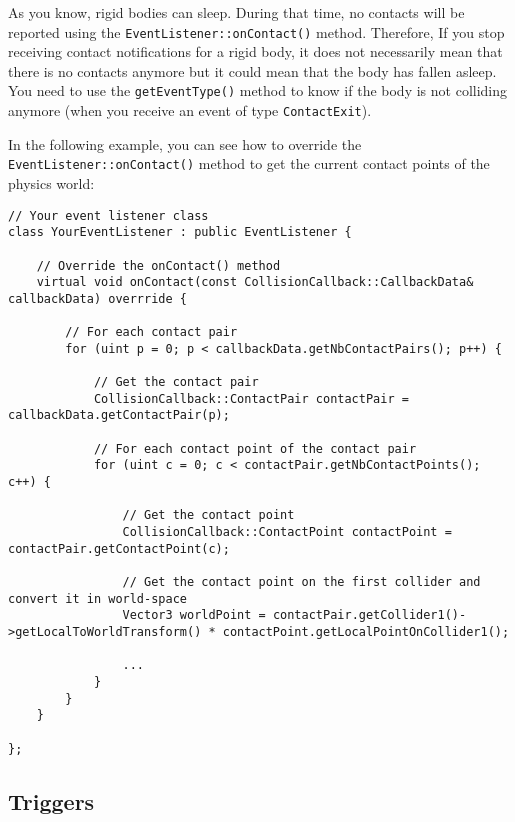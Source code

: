 \documentclass[a4paper,12pt]{article}
\begin{document}
    \begin{sloppypar}
    As you know, rigid bodies can sleep. During that time, no contacts will be reported using the \texttt{EventListener::onContact()} method. Therefore,
    If you stop receiving contact notifications for a rigid body, it does not necessarily mean that there is no contacts anymore but it could mean that the
    body has fallen asleep. You need to use the \texttt{getEventType()} method to know if the body is not colliding anymore (when you receive an event of type
    \texttt{ContactExit}). \\
    \end{sloppypar}

    \begin{sloppypar}
    In the following example, you can see how to override the \texttt{EventListener::onContact()} method to get the current contact points of the physics
    world: \\
    \end{sloppypar}

    \begin{lstlisting}
// Your event listener class
class YourEventListener : public EventListener {

	// Override the onContact() method
	virtual void onContact(const CollisionCallback::CallbackData& callbackData) overrride {

		// For each contact pair
		for (uint p = 0; p < callbackData.getNbContactPairs(); p++) {

			// Get the contact pair
			CollisionCallback::ContactPair contactPair = callbackData.getContactPair(p);

			// For each contact point of the contact pair
			for (uint c = 0; c < contactPair.getNbContactPoints(); c++) {

			    // Get the contact point
			    CollisionCallback::ContactPoint contactPoint = contactPair.getContactPoint(c);

			    // Get the contact point on the first collider and convert it in world-space
			    Vector3 worldPoint = contactPair.getCollider1()->getLocalToWorldTransform() * contactPoint.getLocalPointOnCollider1();

			    ...
			}
		}
	}

};
    \end{lstlisting}

    \subsection{Triggers}
    \label{sec:eventlistenertriggers}
\end{document}
